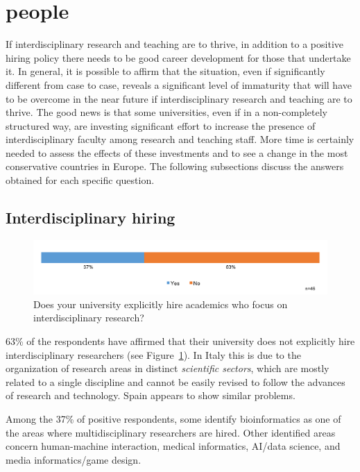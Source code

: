 \section{people}

If interdisciplinary research and teaching are to thrive, in addition to a positive hiring policy there needs to be good career development for those that undertake it.
 In general, it is possible to affirm that the situation,
even if significantly different from case to case, reveals a
significant level of immaturity that will have to be overcome in the
near future if interdisciplinary research and teaching are to thrive. The good news is that some universities, even if in
a non-completely structured way, are investing significant effort to
increase the presence of interdisciplinary faculty among research and
teaching staff. More time is certainly needed to assess the
effects of these investments and to see a change in the most
conservative countries in Europe. The 
following subsections discuss the answers obtained for each specific
question.

\subsection{Interdisciplinary hiring}\label{sec:hiring}

\begin{figure}[h]
\centering
\includegraphics[width = \linewidth]{charts/3a.png}
\caption{Does your university explicitly hire academics
  who focus on interdisciplinary research?}
\label{sect3:hirings}
\end{figure}

63\% of the respondents have affirmed that their university does not
explicitly hire interdisciplinary researchers (see Figure~\ref{sect3:hirings}). In Italy this is 
due to the organization of research areas in distinct \emph{scientific
  sectors}, which are mostly related to a single discipline and cannot be easily revised to follow the advances of
research and technology. Spain appears to show similar problems.

Among the 37\% of positive respondents, some identify bioinformatics
as one of the areas where multidisciplinary researchers are hired. 
Other identified areas concern human-machine interaction, medical
informatics, AI/data science, and media informatics/game design.

